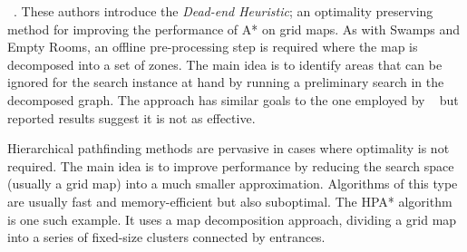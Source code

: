 \citeauthor{bjornsson06}~.  These authors introduce the
\emph{Dead-end Heuristic}; an optimality preserving
 method for improving the performance of A* on grid maps.
As with Swamps and Empty Rooms, an offline pre-processing step is required where
the map is decomposed into a set of zones.  The main idea is to identify areas
that can be ignored for the search instance at hand by running a preliminary
search in the decomposed graph.  The approach has similar goals to the one
employed by \citeauthor{pochter10}~ but reported results
suggest it is not as effective.
\par
Hierarchical pathfinding methods are pervasive in cases where optimality is
not required.  The main idea is to improve performance by reducing the 
search space (usually a grid map) into a much smaller approximation.  Algorithms
of this type are  usually fast and memory-efficient but also suboptimal.  The HPA*
algorithm \cite{botea04} is one such example.  It uses a map decomposition
approach, dividing a grid map into a series of fixed-size clusters connected by
entrances.
